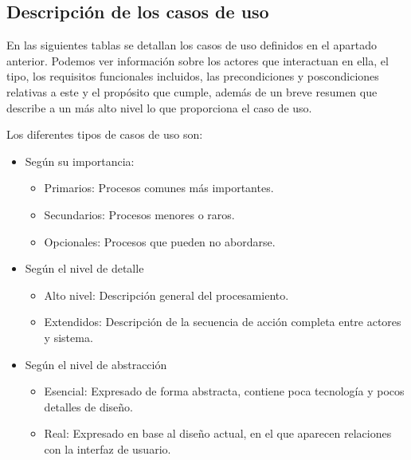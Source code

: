 \subsection{Descripción de los casos de uso}

En las siguientes tablas se detallan los casos de uso definidos en el apartado anterior. Podemos ver información sobre
los actores que interactuan en ella, el tipo, los requisitos funcionales incluidos, las precondiciones y
poscondiciones relativas a este y el propósito que cumple, además de un breve resumen que describe a un más alto
nivel lo que proporciona el caso de uso.

Los diferentes tipos de casos de uso son:

\begin{itemize}
    \item Según su importancia:
    \begin{itemize}
        \item Primarios: Procesos comunes más importantes.
        \item Secundarios: Procesos menores o raros.
        \item Opcionales: Procesos que pueden no abordarse.
    \end{itemize}

    \item Según el nivel de detalle
    \begin{itemize}
        \item Alto nivel: Descripción general del procesamiento.
        \item Extendidos: Descripción de la secuencia de acción completa entre actores y sistema.
    \end{itemize}

    \item Según el nivel de abstracción
    \begin{itemize}
        \item Esencial: Expresado de forma abstracta, contiene poca tecnología y pocos detalles de diseño.
        \item Real: Expresado en base al diseño actual, en el que aparecen relaciones con la interfaz de usuario.
    \end{itemize}
\end{itemize}


